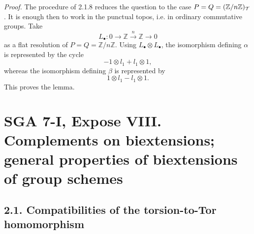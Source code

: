 \documentclass[11pt]{article}
\providecommand{\Spec}{\operatorname{Spec}}
\providecommand{\Pic}{\operatorname{Pic}}
\providecommand{\Tor}{\operatorname{Tor}}
\providecommand{\Ker}{\operatorname{Ker}}
\providecommand{\Z}{\mathbb Z}
\providecommand{\Q}{\mathbb Q}
\providecommand{\Ql}{\mathbb Q_\ell}
\providecommand{\Zl}{\mathbb Z_\ell}
\providecommand{\Gm}{\mathbb G_m}
\providecommand{\Hom}{\operatorname{Hom}}
\providecommand{\Ext}{\operatorname{Ext}}
\providecommand{\id}{\operatorname{id}}
\begin{document}
\emph{Proof.}  The procedure of 2.1.8 reduces the question to the case \(P=Q=(\mathbb Z/n\mathbb Z)_\mathcal T\).  It is enough then to work in the punctual topos, i.e. in ordinary commutative groups.  Take
\[
        L_\bullet:0\longrightarrow\mathbb Z\xrightarrow{n}\mathbb Z\longrightarrow0
\]
as a flat resolution of \(P=Q=\mathbb Z/n\mathbb Z\).  Using \(L_\bullet\otimes L_\bullet\), the isomorphism defining \(\alpha\) is represented by the cycle
\[
        -1\otimes l_1+l_1\otimes1,
\]
whereas the isomorphism defining \(\beta\) is represented by
\[
        1\otimes l_1-l_1\otimes1.
\]
This proves the lemma.



\providecommand{\Tate}{\mathrm T}
\providecommand{\Vtate}{\mathrm V}
\providecommand{\Biext}{\operatorname{Biext}}
\providecommand{\BIEXT}{\operatorname{BIEXT}}
\providecommand{\Ext}{\operatorname{Ext}}
\providecommand{\Tor}{\operatorname{Tor}}
\providecommand{\Hom}{\operatorname{Hom}}
\providecommand{\Coker}{\operatorname{Coker}}
\providecommand{\Spec}{\operatorname{Spec}}
\providecommand{\Pic}{\operatorname{Pic}}
\providecommand{\Ker}{\operatorname{Ker}}
\providecommand{\Gm}{\mathbb G_m}
\providecommand{\Ga}{\mathbb G_a}
\providecommand{\Z}{\mathbb Z}
\providecommand{\Q}{\mathbb Q}
\providecommand{\Ql}{\mathbb Q_\ell}
\providecommand{\Zl}{\mathbb Z_\ell}
\providecommand{\muN}{\boldsymbol\mu}
\providecommand{\nr}{\mathrm{nr}}
\providecommand{\ab}{\mathrm{ab}}
\providecommand{\tr}{\operatorname{tr}}
\providecommand{\id}{\mathrm{id}}


\section*{SGA 7-I, Expose VIII. Complements on biextensions; general properties of biextensions of group schemes}
\subsection*{2.1. Compatibilities of the torsion-to-Tor homomorphism}
\end{document}

